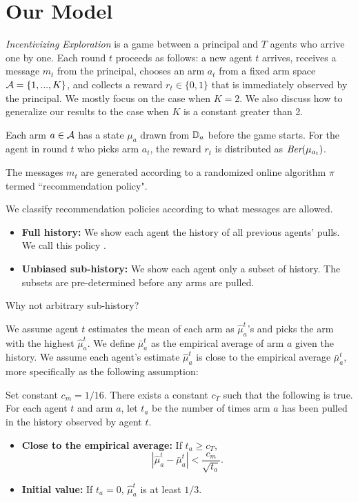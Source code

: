 \section{Our Model}
\label{sec:model}

\emph{Incentivizing Exploration} is a game between a principal and $T$ agents who arrive one by one. Each round $t$ proceeds as follows: a new agent $t$ arrives, receives a message $m_t$ from the principal, chooses an arm $a_t$ from a fixed arm space $\mathcal{A} = \{1,...,K\}$, and collects a reward $r_t\in \{0,1\}$ that is immediately observed by the principal. 
We mostly focus on the case when $K=2$. We also discuss how to generalize our results to the case when $K$ is a constant greater than 2.

Each arm $a \in \mathcal{A}$ has a state $\mu_a$ drawn from $\mathbb{D}_a$ before the game starts. For the agent in round $t$ who picks arm $a_t$, the reward $r_t$ is distributed as $\emph{Ber}(\mu_{a_t})$.

The messages $m_t$ are generated according to a randomized online algorithm $\pi$ termed ``recommendation policy".

 We classify recommendation policies according to what messages are allowed. 
\begin{itemize}
\item \textbf{Full history:} We show each agent the history of all previous agents' pulls. We call this policy \ALGG. 
\item \textbf{Unbiased sub-history:} We show each agent only a subset of history. The subsets are pre-determined before any arms are pulled.  
\end{itemize}

\begin{remark}
Why not arbitrary sub-history?
\end{remark}

 We assume agent $t$ estimates the mean of each arm as $\hat{\mu}_a^t$'s and picks the arm with the highest $\hat{\mu}_a^t$. We define $\bar{\mu}_a^t$ as the empirical average of arm $a$ given the history. We assume each agent's estimate $\hat{\mu}_a^t$ is close to the empirical average $\bar{\mu}_a^t$, more specifically as the following assumption:
\begin{assumption}
\label{ass:embehave}
Set constant $c_m = 1/16$. There exists a constant $c_T$ such that the following is true. For each agent $t$ and arm $a$, let $t_a$ be the number of times arm $a$ has been pulled in the history observed by agent $t$. 
\begin{itemize}
\item \textbf{Close to the empirical average:} If $t_a \geq c_T$, 
\[
|\hat{\mu}^t_a - \bar{\mu}^t_a | < \frac{c_m}{\sqrt{t_a}}.
\]
\item \textbf{Initial value:} If $t_a = 0$, $\hat{\mu}^t_a$ is at least $1/3$. 
\end{itemize}
\end{assumption}


